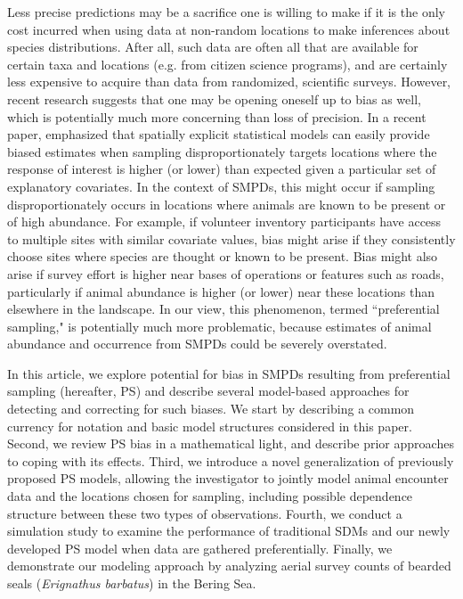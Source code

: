 \documentclass[times,mee,doublespace,]{besauth2}
\begin{document}
Less precise predictions may be a sacrifice one is willing to make if it is the only cost incurred when using data at non-random locations to make inferences about species distributions.  After all, such data are often all that are available for certain taxa and locations (e.g. from citizen science programs), and are certainly less expensive to acquire than data from randomized, scientific surveys.  However, recent research suggests that one may be opening oneself up to bias as well, which is potentially much more concerning than loss of precision. In a recent paper, \citet{DiggleEtAl2010} emphasized that spatially explicit statistical models can easily provide biased estimates when sampling disproportionately targets locations where the response of interest is higher (or lower) than expected given a particular set of explanatory covariates.  In the context of SMPDs, this might occur if sampling disproportionately occurs in locations where animals are known to be present or of high abundance. For example, if volunteer inventory participants have access to multiple sites with similar covariate values, bias might arise if they consistently choose sites where species are thought or known to be present.  Bias might also arise if survey effort is higher near bases of operations or features such as roads, particularly if animal abundance is higher (or lower) near these locations than elsewhere in the landscape.  In our view, this phenomenon, termed ``preferential sampling," is potentially much more problematic, because estimates of animal abundance and occurrence from SMPDs could be severely overstated.

In this article, we explore potential for bias in SMPDs resulting from preferential sampling (hereafter, PS) and describe several model-based approaches for detecting and correcting for such biases.  We start by describing a common currency for notation and basic model structures considered in this paper.  Second, we review PS bias in a mathematical light, and describe prior approaches to coping with its effects. Third, we introduce a novel generalization of previously proposed PS models, allowing the investigator to jointly model animal encounter data and the locations chosen for sampling, including possible dependence structure between these two types of observations.  Fourth, we conduct a simulation study to examine the performance of traditional SDMs and our newly developed PS model when data are gathered preferentially.  Finally, we demonstrate our modeling approach by analyzing aerial survey counts of bearded seals (\textit{Erignathus barbatus}) in the Bering Sea.
\end{document}
